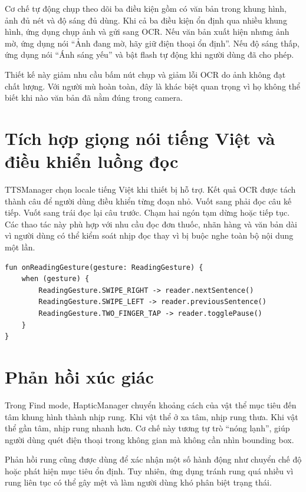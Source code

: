 \documentclass[a4paper,13pt]{report}
\begin{document}
Cơ chế tự động chụp theo dõi ba điều kiện gồm có văn bản trong khung hình, ảnh đủ nét và độ sáng đủ dùng. Khi cả ba điều kiện ổn định qua nhiều khung hình, ứng dụng chụp ảnh và gửi sang OCR. Nếu văn bản xuất hiện nhưng ảnh mờ, ứng dụng nói ``Ảnh đang mờ, hãy giữ điện thoại ổn định''. Nếu độ sáng thấp, ứng dụng nói ``Ánh sáng yếu'' và bật flash tự động khi người dùng đã cho phép.

Thiết kế này giảm nhu cầu bấm nút chụp và giảm lỗi OCR do ảnh không đạt chất lượng. Với người mù hoàn toàn, đây là khác biệt quan trọng vì họ không thể biết khi nào văn bản đã nằm đúng trong camera.

\section{Tích hợp giọng nói tiếng Việt và điều khiển luồng đọc}

TTSManager chọn locale tiếng Việt khi thiết bị hỗ trợ. Kết quả OCR được tách thành câu để người dùng điều khiển từng đoạn nhỏ. Vuốt sang phải đọc câu kế tiếp. Vuốt sang trái đọc lại câu trước. Chạm hai ngón tạm dừng hoặc tiếp tục. Các thao tác này phù hợp với nhu cầu đọc đơn thuốc, nhãn hàng và văn bản dài vì người dùng có thể kiểm soát nhịp đọc thay vì bị buộc nghe toàn bộ nội dung một lần.

\begin{lstlisting}[caption={Ánh xạ cử chỉ điều khiển luồng đọc}]
fun onReadingGesture(gesture: ReadingGesture) {
    when (gesture) {
        ReadingGesture.SWIPE_RIGHT -> reader.nextSentence()
        ReadingGesture.SWIPE_LEFT -> reader.previousSentence()
        ReadingGesture.TWO_FINGER_TAP -> reader.togglePause()
    }
}
\end{lstlisting}

\section{Phản hồi xúc giác}

Trong Find mode, HapticManager chuyển khoảng cách của vật thể mục tiêu đến tâm khung hình thành nhịp rung. Khi vật thể ở xa tâm, nhịp rung thưa. Khi vật thể gần tâm, nhịp rung nhanh hơn. Cơ chế này tương tự trò ``nóng lạnh'', giúp người dùng quét điện thoại trong không gian mà không cần nhìn bounding box.

Phản hồi rung cũng được dùng để xác nhận một số hành động như chuyển chế độ hoặc phát hiện mục tiêu ổn định. Tuy nhiên, ứng dụng tránh rung quá nhiều vì rung liên tục có thể gây mệt và làm người dùng khó phân biệt trạng thái.
\end{document}
